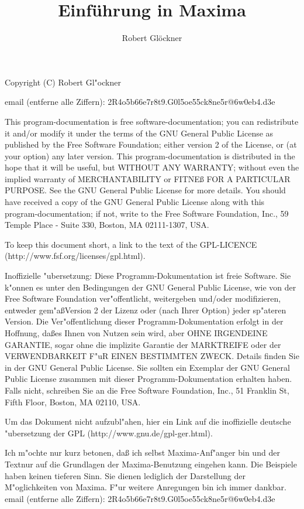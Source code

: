 \documentclass[spanish,12pt,a4paper]{article}
\title{\textbf{\Huge{Einf\"{u}hrung in Maxima}}}
\author{Robert Gl\"{o}ckner}
\begin{document}
\maketitle
\tableofcontents

Copyright (C) Robert Gl"ockner

email (entferne alle Ziffern): 2R4o5b66e7r8t9.G0l5oe55ck8ne5r@6w0eb4.d3e

\scriptsize
This program-documentation is free software-documentation; you can redistribute it and/or modify it under the terms of the GNU General Public License as published by the Free Software Foundation; either version 2 of the License, or (at your option) any later version.
This program-documentation is distributed in the hope that it will be useful, but WITHOUT ANY WARRANTY; without even the implied warranty of MERCHANTABILITY or FITNE{\ss} FOR A PARTICULAR PURPOSE. See the GNU General Public License for more details.
You should have received a copy of the GNU General Public License along with this program-documentation; if not, write to the Free Software Foundation, Inc., 59 Temple Place - Suite 330, Boston, MA 02111-1307, USA.

To keep this document short, a link to the text of the GPL-LICENCE (http://www.fsf.org/licenses/gpl.html).

Inoffizielle "ubersetzung: Diese Programm-Dokumentation ist freie Software. Sie k"onnen es unter den Bedingungen der GNU General Public License, wie von der Free Software Foundation ver"offentlicht, weitergeben und/oder modifizieren, entweder gem"a{\ss}Version 2 der Lizenz oder (nach Ihrer Option) jeder sp"ateren Version.
Die Ver"offentlichung dieser Programm-Dokumentation erfolgt in der Hoffnung, da{\ss}es Ihnen von Nutzen sein wird, aber OHNE IRGENDEINE GARANTIE, sogar ohne die implizite Garantie der MARKTREIFE oder der VERWENDBARKEIT F"uR EINEN BESTIMMTEN ZWECK. Details finden Sie in der GNU General Public License.
Sie sollten ein Exemplar der GNU General Public License zusammen mit dieser Programm-Dokumentation erhalten haben. Falls nicht, schreiben Sie an die Free Software Foundation, Inc., 51 Franklin St, Fifth Floor, Boston, MA 02110, USA.

Um das Dokument nicht aufzubl"ahen, hier ein Link auf die inoffizielle deutsche "ubersetzung der GPL (http://www.gnu.de/gpl-ger.html).
\normalsize

Ich m"ochte nur kurz betonen, da{\ss} ich selbst Maxima-Anf"anger bin und der Textnur auf die Grundlagen der Maxima-Benutzung eingehen kann. Die Beispiele haben keinen tieferen Sinn. Sie dienen lediglich der Darstellung der M"oglichkeiten von Maxima.
F"ur weitere Anregungen bin ich immer dankbar.
email (entferne alle Ziffern): 2R4o5b66e7r8t9.G0l5oe55ck8ne5r@6w0eb4.d3e
\end{document}
